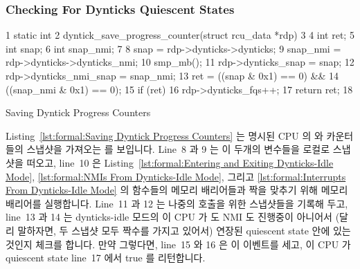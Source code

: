 \subsubsection{Checking For Dynticks Quiescent States}
\label{sec:formal:Checking For Dynticks Quiescent States}

\begin{listing}[tbp]
{ \scriptsize
\begin{verbbox}
 1  static int
 2  dyntick_save_progress_counter(struct rcu_data *rdp)
 3  {
 4    int ret;
 5    int snap;
 6    int snap_nmi;
 7 
 8    snap = rdp->dynticks->dynticks;
 9    snap_nmi = rdp->dynticks->dynticks_nmi;
10    smp_mb();
11    rdp->dynticks_snap = snap;
12    rdp->dynticks_nmi_snap = snap_nmi;
13    ret = ((snap & 0x1) == 0) &&
14          ((snap_nmi & 0x1) == 0);
15    if (ret)
16      rdp->dynticks_fqs++;
17    return ret;
18  }
\end{verbbox}
}
\centering
\theverbbox
\caption{Saving Dyntick Progress Counters}
\label{lst:formal:Saving Dyntick Progress Counters}
\end{listing}

Listing~\ref{lst:formal:Saving Dyntick Progress Counters}
는 명시된 CPU 의  와  카운터들의 스냅샷을 가져오는
 를 보입니다.
Line~8 과 9 는 이 두개의 변수들을 로컬로 스냅샷을 떠오고, line~10 은
Listing~\ref{lst:formal:Entering and Exiting Dynticks-Idle Mode},
\ref{lst:formal:NMIs From Dynticks-Idle Mode}, 그리고
\ref{lst:formal:Interrupts From Dynticks-Idle Mode} 의 함수들의 메모리
배리어들과 짝을 맞추기 위해 메모리 배리어를 실행합니다.
Line~11 과 12 는 나중의  호출을 위한 스냅샷들을
기록해 두고, line~13 과 14 는 dynticks-idle 모드의 이 CPU 가 \IRQ 도 NMI 도
진행중이 아니어서 (달리 말하자면, 두 스냅샷 모두 짝수를 가지고 있어서) 연장된
quiescent state 안에 있는 것인지 체크를 합니다.
만약 그렇다면, line~15 와 16 은 이 이벤트를 세고, 이 CPU 가 quiescent state
line~17 에서 true 를 리턴합니다.
\iffalse

Listing~\ref{lst:formal:Saving Dyntick Progress Counters}
shows \co{dyntick_save_progress_counter()}, which takes a snapshot
of the specified CPU's \co{dynticks} and \co{dynticks_nmi}
counters.
Lines~8 and~9 snapshot these two variables to locals, line~10
executes a memory barrier to pair with the memory barriers in
the functions in
Listings~\ref{lst:formal:Entering and Exiting Dynticks-Idle Mode},
\ref{lst:formal:NMIs From Dynticks-Idle Mode}, and
\ref{lst:formal:Interrupts From Dynticks-Idle Mode}.
Lines~11 and~12 record the snapshots for later calls to
\co{rcu_implicit_dynticks_qs()},
and lines~13 and~14 check to see if the CPU is in dynticks-idle mode with
neither \IRQ s nor NMIs in progress (in other words, both snapshots
have even values), hence in an extended quiescent state.
If so, lines~15 and~16 count this event, and line~17 returns
true if the CPU was in a quiescent state.
\fi


